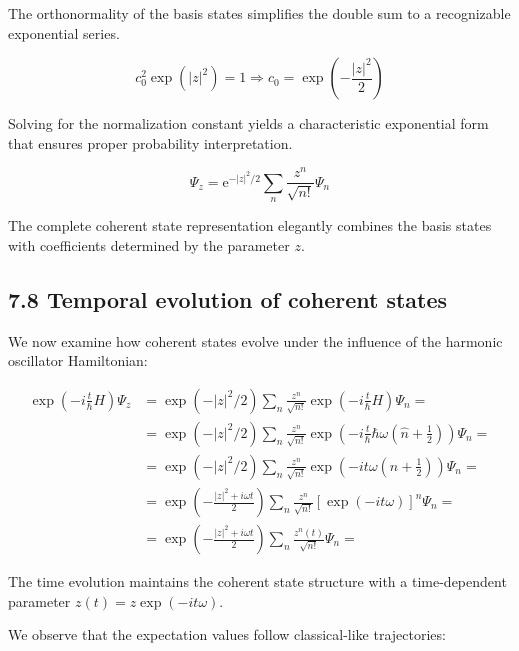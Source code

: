 \documentclass[10pt]{article}
\begin{document}
The orthonormality of the basis states simplifies the double sum to a recognizable exponential series.

\begin{equation*}
c_{0}^{2} \exp \left(|z|^{2}\right)=1 \Longrightarrow c_{0}=\exp \left(-\frac{|z|^{2}}{2}\right) \tag{7.87}
\end{equation*}

Solving for the normalization constant yields a characteristic exponential form that ensures proper probability interpretation.

\begin{equation*}
\Psi_{z}=\mathrm{e}^{-|z|^{2} / 2} \sum_{n} \frac{z^{n}}{\sqrt{n!}} \Psi_{n} \tag{7.88}
\end{equation*}

The complete coherent state representation elegantly combines the basis states with coefficients determined by the parameter $z$.

\subsection*{7.8 Temporal evolution of coherent states}
We now examine how coherent states evolve under the influence of the harmonic oscillator Hamiltonian:

\begin{align*}
\exp \left(-i \frac{t}{\hbar} H\right) \Psi_{z} & =\exp \left(-|z|^{2} / 2\right) \sum_{n} \frac{z^{n}}{\sqrt{n!}} \exp \left(-i \frac{t}{\hbar} H\right) \Psi_{n}= \\
& =\exp \left(-|z|^{2} / 2\right) \sum_{n} \frac{z^{n}}{\sqrt{n!}} \exp \left(-i \frac{t}{\hbar} \hbar \omega\left(\hat{n}+\frac{1}{2}\right)\right) \Psi_{n}= \\
& =\exp \left(-|z|^{2} / 2\right) \sum_{n} \frac{z^{n}}{\sqrt{n!}} \exp \left(-i t \omega\left(n+\frac{1}{2}\right)\right) \Psi_{n}= \\
& =\exp \left(-\frac{|z|^{2}+i \omega t}{2}\right) \sum_{n} \frac{z^{n}}{\sqrt{n!}}[\exp (-i t \omega)]^{n} \Psi_{n}= \\
& =\exp \left(-\frac{|z|^{2}+i \omega t}{2}\right) \sum_{n} \frac{z^{n}(t)}{\sqrt{n!}} \Psi_{n}= \tag{7.89}
\end{align*}

The time evolution maintains the coherent state structure with a time-dependent parameter $z(t)=z \exp (-i t \omega)$.

We observe that the expectation values follow classical-like trajectories:
\end{document}
